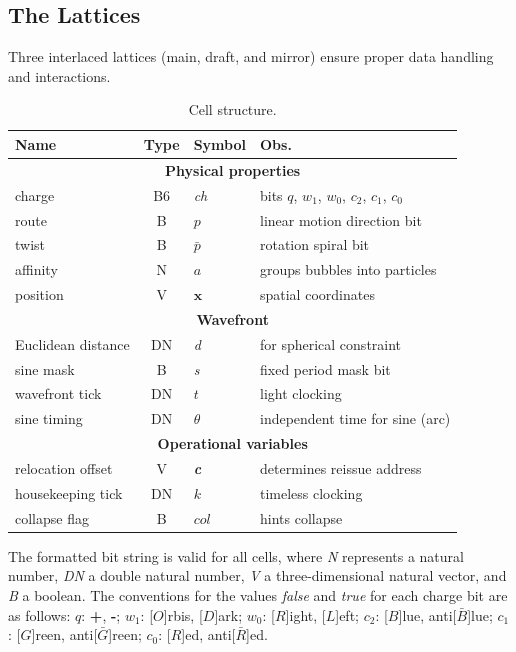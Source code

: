 \documentclass[12pt]{article}
\begin{document}
\subsection{The Lattices}
Three interlaced lattices (main, draft, and mirror) ensure proper data handling and interactions.

\begin{table}
\begin{centering}
\begin{tabular}{|l|c|l|l|}
\hline 
\textbf{\large{}Name} & \textbf{\large{}Type} & \textbf{\large{}Symbol} & \textbf{\large{}Obs.}\tabularnewline
\hline 
\hline 
\multicolumn{4}{|c|}{\textbf{Physical properties}}\tabularnewline
\hline 
charge & B6 & \emph{ch} & bits $q$, $w_{1}$, $w_{0}$, $c_{2}$, $c_{1}$, $c_{0}$\tabularnewline
\hline 
route & B & $p$ & linear motion direction bit\tabularnewline
\hline 
twist & B & $\bar{p}$ & rotation spiral bit\tabularnewline
\hline 
affinity & N & $a$ & groups bubbles into particles\tabularnewline
\hline 
position & V & $\boldsymbol{x}$ & spatial coordinates\tabularnewline
\hline 
\multicolumn{4}{|c|}{\textbf{Wavefront}}\tabularnewline
\hline 
Euclidean distance & DN & \emph{d} & for spherical constraint\tabularnewline
\hline 
sine mask & B & \emph{s} & fixed period mask bit\tabularnewline
\hline 
wavefront tick & DN & $t$ & light clocking\tabularnewline
\hline 
sine timing & DN & $\theta$ & independent time for sine (arc)\tabularnewline
\hline 
\multicolumn{4}{|c|}{\textbf{Operational variables}}\tabularnewline
\hline 
relocation offset & V & \textbf{\emph{c}} & determines reissue address\tabularnewline
\hline 
housekeeping tick & DN & $k$ & timeless clocking\tabularnewline
\hline 
collapse flag & B & $col$ & hints collapse\tabularnewline
\hline 
\end{tabular}
\par\end{centering}
\caption{Cell structure.}
{\small{}The formatted bit string is valid for all cells, where }\emph{\small{}N}{\small{}
represents a natural number, }\emph{\small{}DN}{\small{} 
a double natural number, }\emph{\small{}V}{\small{} a three-dimensional natural vector, and }\emph{\small{}B}{\small{} 
a boolean. The conventions for the values }\emph{\small{}false}{\small{} and }\emph{\small{}true}{\small{} for each 
charge bit are as follows: $q$: }\textbf{\small{}+}{\small{}, }\textbf{\small{}-}{\small{}; $w_{1}$: {[}$O${]}rbis, {[}$D${]}ark; 
$w_{0}$: {[}$R${]}ight, {[}$L${]}eft; $c_{2}$: {[}$B${]}lue, anti{[}$\bar{B}${]}lue; $c_{1}$: {[}$G${]}reen, anti{[}$\bar{G}${]}reen; 
$c_{0}$: {[}$R${]}ed, anti{[}$\bar{R}${]}ed.}\label{tab:Cell-structure}
\end{table}
\end{document}
